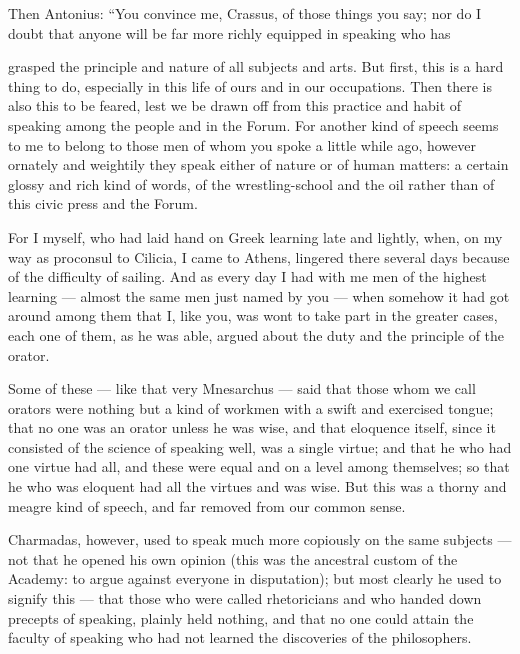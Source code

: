  Then Antonius: ``You convince me, Crassus, of those things you say; nor do I doubt that anyone will be far more richly equipped in speaking who has

 grasped the principle and nature of all subjects and arts. But first, this is a hard thing to do, especially in this life of ours and in our occupations. Then there is also this to be feared, lest we be drawn off from this practice and habit of speaking among the people and in the Forum. For another kind of speech seems to me to belong to those men of whom you spoke a little while ago, however ornately and weightily they speak either of nature or of human matters: a certain glossy and rich kind of words, of the wrestling-school and the oil rather than of this civic press and the Forum.

 For I myself, who had laid hand on Greek learning late and lightly, when, on my way as proconsul to Cilicia, I came to Athens, lingered there several days because of the difficulty of sailing. And as every day I had with me men of the highest learning — almost the same men just named by you — when somehow it had got around among them that I, like you, was wont to take part in the greater cases, each one of them, as he was able, argued about the duty and the principle of the orator.

 Some of these — like that very Mnesarchus — said that those whom we call orators were nothing but a kind of workmen with a swift and exercised tongue; that no one was an orator unless he was wise, and that eloquence itself, since it consisted of the science of speaking well, was a single virtue; and that he who had one virtue had all, and these were equal and on a level among themselves; so that he who was eloquent had all the virtues and was wise. But this was a thorny and meagre kind of speech, and far removed from our common sense.

 Charmadas, however, used to speak much more copiously on the same subjects — not that he opened his own opinion (this was the ancestral custom of the Academy: to argue against everyone in disputation); but most clearly he used to signify this — that those who were called rhetoricians and who handed down precepts of speaking, plainly held nothing, and that no one could attain the faculty of speaking who had not learned the discoveries of the philosophers.

